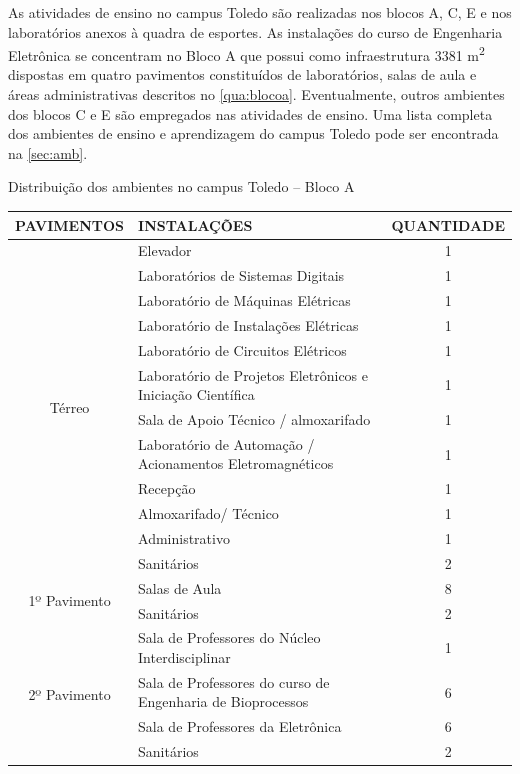 As atividades de ensino no campus Toledo são realizadas nos blocos A, C, E e nos laboratórios anexos à quadra de esportes. As instalações do curso de Engenharia Eletrônica se concentram no Bloco A que possui como infraestrutura 3381 m\textsuperscript{2} dispostas em quatro pavimentos constituídos de laboratórios, salas de aula e áreas administrativas descritos no \autoref{qua:blocoa}. Eventualmente, outros ambientes dos blocos C e E são empregados nas atividades de ensino. Uma lista completa dos ambientes de ensino e aprendizagem do campus Toledo pode ser encontrada na \autoref{sec:amb}.

\begin{quadro}
    \centering\small
	\caption[Distribuição dos ambientes no campus Toledo – Bloco A]{Distribuição dos ambientes no campus Toledo – Bloco A}
    \begin{tabularx}{\textwidth}{c >{\centering\arraybackslash}X  c}
        \toprule
        PAVIMENTOS & INSTALAÇÕES & QUANTIDADE \\ \midrule \midrule

        \multirow{12}{*}{ Térreo } & Elevador & 1 \\
        & Laboratórios de Sistemas Digitais & 1 \\
        & Laboratório de Máquinas Elétricas & 1 \\
        & Laboratório de Instalações Elétricas & 1 \\
        & Laboratório de Circuitos Elétricos & 1 \\
        & Laboratório de Projetos Eletrônicos e Iniciação Científica & 1 \\
        & Sala de Apoio Técnico / almoxarifado & 1 \\
        & Laboratório de Automação / Acionamentos Eletromagnéticos & 1 \\
        & Recepção & 1 \\
        & Almoxarifado/ Técnico & 1 \\
        & Administrativo & 1 \\
        & Sanitários & 2 \\ \midrule

        \multirow{2}{*}{ 1º Pavimento } & Salas de Aula & 8 \\
        & Sanitários & 2 \\ \midrule

        \multirow{4}{*}{ 2º Pavimento } & Sala de Professores do Núcleo Interdisciplinar & 1 \\
        & Sala de Professores do curso de Engenharia de Bioprocessos & 6 \\
        & Sala de Professores da Eletrônica & 6 \\
        & Sanitários & 2 \\ \midrule


\end{tabularx}
\end{quadro}
